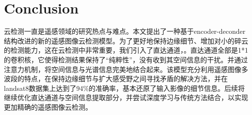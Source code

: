 \documentclass[UTF8]{ctexart}
\begin{document}
\section[]{Conclusion}
云检测一直是遥感领域的研究热点与难点。本文提出了一种基于encoder-deconder结构改进的新的遥感图像云检测模型。为了更好地保持边缘细节、增加对小的碎云的检测能力，这在云检测中非常重要，我们引入了直达通道，。直达通道全部是1*1的卷积核，它使得检测结果保持了“纯粹性”，没有收到其空间信息的干扰。并通过注意力机制，将空间信息与光谱信息完美地结合起来。该模型充分利用遥感图像多波段的特点，在保持边缘细节与扩大感受野之间寻找矛盾的解决方法，并在landsat8数据集上达到了94\%的准确率，基本还原了输入影像的细节信息。后续将继续优化直达通道与空间信息提取部分，并尝试深度学习与传统方法结合，以实现更加精确的遥感图像云检测。

\end{document}
